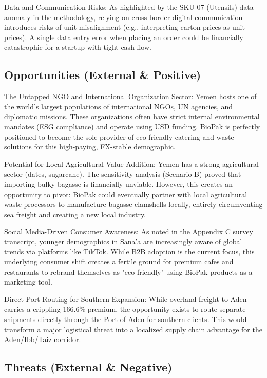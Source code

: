 \documentclass[12pt,a4paper]{article}
\begin{document}
Data and Communication Risks: As highlighted by the SKU 07 (Utensils) data anomaly in the methodology, relying on cross-border digital communication introduces risks of unit misalignment (e.g., interpreting carton prices as unit prices). A single data entry error when placing an order could be financially catastrophic for a startup with tight cash flow.

\subsection{Opportunities (External \& Positive)}

The Untapped NGO and International Organization Sector: Yemen hosts one of the world's largest populations of international NGOs, UN agencies, and diplomatic missions. These organizations often have strict internal environmental mandates (ESG compliance) and operate using USD funding. BioPak is perfectly positioned to become the sole provider of eco-friendly catering and waste solutions for this high-paying, FX-stable demographic.

Potential for Local Agricultural Value-Addition: Yemen has a strong agricultural sector (dates, sugarcane). The sensitivity analysis (Scenario B) proved that importing bulky bagasse is financially unviable. However, this creates an opportunity to pivot: BioPak could eventually partner with local agricultural waste processors to manufacture bagasse clamshells locally, entirely circumventing sea freight and creating a new local industry.

Social Media-Driven Consumer Awareness: As noted in the Appendix C survey transcript, younger demographics in Sana'a are increasingly aware of global trends via platforms like TikTok. While B2B adoption is the current focus, this underlying consumer shift creates a fertile ground for premium cafes and restaurants to rebrand themselves as "eco-friendly" using BioPak products as a marketing tool.

Direct Port Routing for Southern Expansion: While overland freight to Aden carries a crippling 166.6\% premium, the opportunity exists to route separate shipments directly through the Port of Aden for southern clients. This would transform a major logistical threat into a localized supply chain advantage for the Aden/Ibb/Taiz corridor.

\subsection{Threats (External \& Negative)}
\end{document}
